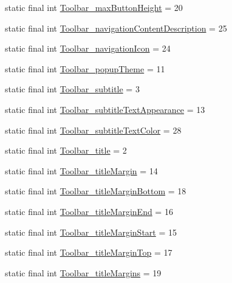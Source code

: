 \begin{CompactItemize}
\item 
static final int \hyperlink{classandroid_1_1support_1_1v4_1_1_r_1_1styleable_ab5a559be253c4d3f91654f99866d524}{Toolbar\_\-maxButtonHeight} = 20
\item 
static final int \hyperlink{classandroid_1_1support_1_1v4_1_1_r_1_1styleable_18960c8315e8816542d771ce838c8551}{Toolbar\_\-navigationContentDescription} = 25
\item 
static final int \hyperlink{classandroid_1_1support_1_1v4_1_1_r_1_1styleable_91d5fad8e57cec704e2157d1f6a7b331}{Toolbar\_\-navigationIcon} = 24
\item 
static final int \hyperlink{classandroid_1_1support_1_1v4_1_1_r_1_1styleable_988c9145b755a926e12ec19da469cd62}{Toolbar\_\-popupTheme} = 11
\item 
static final int \hyperlink{classandroid_1_1support_1_1v4_1_1_r_1_1styleable_477282d30e4e1d001d974339d5a3612e}{Toolbar\_\-subtitle} = 3
\item 
static final int \hyperlink{classandroid_1_1support_1_1v4_1_1_r_1_1styleable_591a12ae0a18148eb5e6102631e7a595}{Toolbar\_\-subtitleTextAppearance} = 13
\item 
static final int \hyperlink{classandroid_1_1support_1_1v4_1_1_r_1_1styleable_6aafb77e85baad2d0ed9e1879c82cf10}{Toolbar\_\-subtitleTextColor} = 28
\item 
static final int \hyperlink{classandroid_1_1support_1_1v4_1_1_r_1_1styleable_b046a72644d4b4e207982a1e5afea260}{Toolbar\_\-title} = 2
\item 
static final int \hyperlink{classandroid_1_1support_1_1v4_1_1_r_1_1styleable_4b5c6289c4f1411b5ea97486e152a575}{Toolbar\_\-titleMargin} = 14
\item 
static final int \hyperlink{classandroid_1_1support_1_1v4_1_1_r_1_1styleable_433a3c5c0de8d666a83b66f953bf878b}{Toolbar\_\-titleMarginBottom} = 18
\item 
static final int \hyperlink{classandroid_1_1support_1_1v4_1_1_r_1_1styleable_ebea2a680be1013dc5ca88339b9360c2}{Toolbar\_\-titleMarginEnd} = 16
\item 
static final int \hyperlink{classandroid_1_1support_1_1v4_1_1_r_1_1styleable_037398ad6eb4fa7d2271f386c71d7350}{Toolbar\_\-titleMarginStart} = 15
\item 
static final int \hyperlink{classandroid_1_1support_1_1v4_1_1_r_1_1styleable_1a1bd2c6b7f34b8a59f7763da63777e2}{Toolbar\_\-titleMarginTop} = 17
\item 
static final int \hyperlink{classandroid_1_1support_1_1v4_1_1_r_1_1styleable_4cf3f31b90bbd9298763173e8ae75087}{Toolbar\_\-titleMargins} = 19

\end{CompactItemize}
